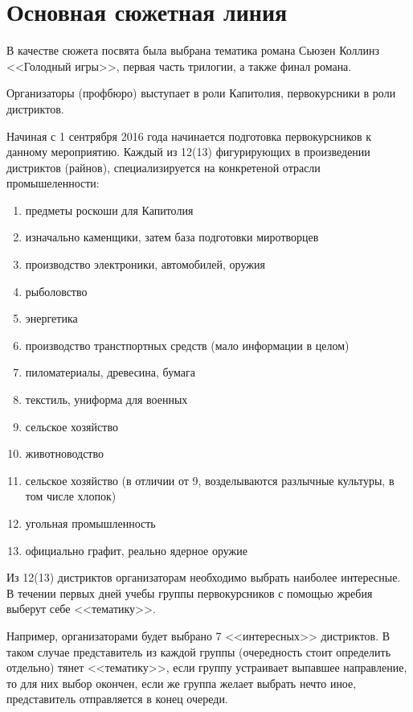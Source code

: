 \documentclass[a4paper, 14pt]{extarticle}
\theoremstyle{definition}
\begin{document}
\cleardoublepage
{}
{}
\section*{Основная сюжетная линия}

\par В качестве сюжета посвята была выбрана тематика романа Сьюзен Коллинз <<Голодный игры>>, первая часть трилогии, а также финал романа.
\par Организаторы (профбюро) выступает в роли Капитолия, первокурсники в роли дистриктов.
\par Начиная с 1 сентрября 2016 года начинается подготовка первокурсников к данному мероприятию. Каждый из 12(13) фигурирующих в произведении дистриктов (райнов), специализируется на конкретеной отрасли промышеленности:

\begin{enumerate}
\item предметы роскоши для Капитолия
\item изначально каменщики, затем база подготовки миротворцев
\item производство электроники, автомобилей, оружия
\item рыболовство
\item энергетика
\item производство транстпортных средств (мало информации в целом)
\item пиломатериалы, древесина, бумага
\item текстиль, униформа для военных
\item сельское хозяйство
\item животноводство
\item сельское хозяйство (в отличии от 9, возделываются разлычные культуры, в том числе хлопок)
\item угольная промышленность
\item официально графит, реально ядерное оружие
\end{enumerate}

\par Из 12(13) дистриктов организаторам необходимо выбрать наиболее интересные. В течении первых дней учебы группы первокурсников с помощью жребия выберут себе <<тематику>>.

\par Например, организаторами будет выбрано 7 <<интересных>> дистриктов. В таком случае представитель из каждой группы (очередность стоит определить отдельно) тянет <<тематику>>, если группу устраивает выпавшее направление, то для них выбор окончен, если же группа желает выбрать нечто иное, представитель отправляется в конец очереди.
\end{document}
